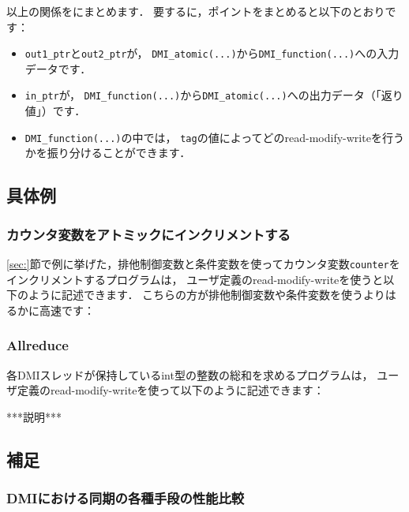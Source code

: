\documentclass[report,12pt]{jsbook}
\begin{document}
以上の関係をにまとめます．
要するに，ポイントをまとめると以下のとおりです：
\begin{itemize}
\item \texttt{out1\_ptr}と\texttt{out2\_ptr}が，
  \texttt{DMI\_atomic(...)}から\texttt{DMI\_function(...)}への入力データです．
\item \texttt{in\_ptr}が，
  \texttt{DMI\_function(...)}から\texttt{DMI\_atomic(...)}への出力データ（「返り値」）です．
\item \texttt{DMI\_function(...)}の中では，
  \texttt{tag}の値によってどのread-modify-writeを行うかを振り分けることができます．
\end{itemize}

\subsection{具体例}

\subsubsection{カウンタ変数をアトミックにインクリメントする}

\ref{sec:}節で例に挙げた，排他制御変数と条件変数を使ってカウンタ変数\texttt{counter}をインクリメントするプログラムは，
ユーザ定義のread-modify-writeを使うと以下のように記述できます．
こちらの方が排他制御変数や条件変数を使うよりはるかに高速です：
\begin{code}
  
\end{code}

\subsubsection{Allreduce}

各DMIスレッドが保持しているint型の整数の総和を求めるプログラムは，
ユーザ定義のread-modify-writeを使って以下のように記述できます：
\begin{code}
  
\end{code}

***説明***

\subsection{補足}

\subsubsection{DMIにおける同期の各種手段の性能比較}
\end{document}
